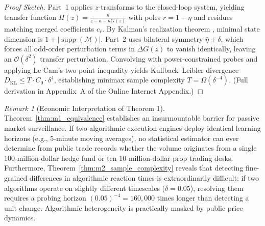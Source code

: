 \documentclass[12pt]{article}
\theoremstyle{definition}
\theoremstyle{remark}
\newtheorem{remark}[theorem]{Remark}
\begin{document}
\begin{proof}[Proof Sketch]
Part~1 applies $z$-transforms to the closed-loop system, yielding transfer function $H(z) = \frac{\kappa}{z - a - \kappa G(z)}$ with poles $r = 1 - \eta$ and residues matching merged coefficients $c_r$. By Kalman's realization theorem \citep{kalman1960}, minimal state dimension is $1 + |\operatorname{supp}(\mathcal{M})|$. Part~2 uses bilateral symmetry $\bar{\eta} \pm \delta$, which forces all odd-order perturbation terms in $\Delta G(z)$ to vanish identically, leaving an $\mathcal{O}(\delta^2)$ transfer perturbation. Convolving with power-constrained probes and applying Le Cam's two-point inequality \citep{lecam1986} yields Kullback--Leibler divergence $D_{\text{KL}} \le T \cdot C_0 \cdot \delta^4$, establishing minimax sample complexity $T = \Omega(\delta^{-4})$. (Full derivation in Appendix~A of the Online Internet Appendix.)
\end{proof}

\begin{remark}[Economic Interpretation of Theorem 1]
Theorem~\ref{thm:m1_equivalence} establishes an insurmountable barrier for passive market surveillance. If two algorithmic execution engines deploy identical learning horizons (e.g., 5-minute moving averages), no statistical estimator can ever determine from public trade records whether the volume originates from a single 100-million-dollar hedge fund or ten 10-million-dollar prop trading desks. 
Furthermore, Theorem~\ref{thm:m2_sample_complexity} reveals that detecting fine-grained differences in algorithmic reaction times is extraordinarily difficult: if two algorithms operate on slightly different timescales ($\delta = 0.05$), resolving them requires a probing horizon $(0.05)^{-4} = 160{,}000$ times longer than detecting a unit change. Algorithmic heterogeneity is practically masked by public price dynamics.
\end{remark}
\end{document}
